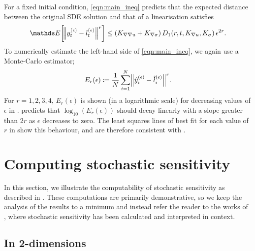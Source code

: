 For a fixed initial condition, \cref{eqn:main_ineq} predicts that the expected distance between the original SDE solution and that of a linearisation satisfies
\[
	\avg{\norm{y_t^{(\epsilon)} - l_t^{(\epsilon)}}^r} \leq \left(K_{\nabla\nabla u} + K_{\nabla\sigma}\right)D_1\!\left(r,t, K_{\nabla u}, K_\sigma\right)\epsilon^{2r}.
\]
To numerically estimate the left-hand side of \cref{eqn:main_ineq}, we again use a Monte-Carlo estimator;
\[
	E_r\!\left(\epsilon\right) \coloneqq \frac{1}{N}\sum_{i=1}^N{\norm{\hat{y}_i^{(\epsilon)} - \hat{l}_i^{(\epsilon)}}^r}.
\]
For \(r = 1,2,3,4\), \(E_r\!\left(\epsilon\right)\) is shown (in a logarithmic scale) for decreasing values of \(\epsilon\) in .
 predicts that \(\log_{10}\left(E_r\!\left(\epsilon\right)\right)\) should decay linearly with a slope greater than \(2r\) as \(\epsilon\) decreases to zero.
The least squares lines of best fit for each value of \(r\) in  show this behaviour, and are therefore consistent with .



\section{Computing stochastic sensitivity} \label{sec:comput_s2}
In this section, we illustrate the computability of stochastic sensitivity as described in .
These computations are primarily demonstrative, so we keep the analysis of the results to a minimum and instead refer the reader to the works of \citet{Balasuriya_2020_StochasticSensitivityComputable,BadzaEtAl_2023_HowSensitiveAre,FangEtAl_2020_DisentanglingResolutionPrecision}, where stochastic sensitivity has been calculated and interpreted in context.

\subsection{In 2-dimensions}\label{sec:compute_s2_2d}

